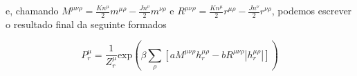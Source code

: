 \documentclass[a4paper, 11pt]{article} %
\begin{document}
e, chamando $M^{\mu\nu\rho} =
\frac{Kn^{\mu}}{2}m^{\mu\rho}-\frac{Jn^{\nu}}{2}m^{\nu\rho} $ e $R^{\mu\nu\rho}
= \frac{Kn^{\mu}}{2}r^{\mu\rho}-\frac{Jn^{\nu}}{2}r^{\nu\rho}$, podemos escrever
o resultado final da seguinte formados

\begin{equation}
    P_r^{\mu} = \frac{1}{Z_r^{\mu}} \mathrm{exp} \left(
    {\beta\sum_{\rho}\left[aM^{\mu\nu\rho}h_r^{\mu\rho}-
bR^{\mu\nu\rho}|h_r^{\mu\rho}|\right]} \right)
\end{equation}






% 

% 

\end{document}
